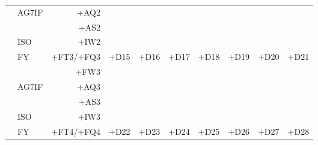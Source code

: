 \begin{center}
{\begin{tabular}{|c|lr|c|c|c|c|c|c|c|}
                        & AG7IF &      +AQ2 &                            &                            &                            &                            &                            &                            &                            \\
                        &       &      +AS2 &                            &                            &                            &                            &                            &                            &                            \\
                        & ISO   &      +IW2 &                            &                            &                            &                            &                            &                            &                            \\
\hline
    \multirow{5}{0.5in}{} & FY    & +FT3/+FQ3 & \multirow[t]{5}{1in}{+D15} & \multirow[t]{5}{1in}{+D16} & \multirow[t]{5}{1in}{+D17} & \multirow[t]{5}{1in}{+D18} & \multirow[t]{5}{1in}{+D19} & \multirow[t]{5}{1in}{+D20} & \multirow[t]{5}{1in}{+D21} \\
                        &       &      +FW3 &                            &                            &                            &                            &                            &                            &                            \\
                        & AG7IF &      +AQ3 &                            &                            &                            &                            &                            &                            &                            \\
                        &       &      +AS3 &                            &                            &                            &                            &                            &                            &                            \\
                        & ISO   &      +IW3 &                            &                            &                            &                            &                            &                            &                            \\
\hline
    \multirow{5}{0.5in}{} & FY    & +FT4/+FQ4 & \multirow[t]{5}{1in}{+D22} & \multirow[t]{5}{1in}{+D23} & \multirow[t]{5}{1in}{+D24} & \multirow[t]{5}{1in}{+D25} & \multirow[t]{5}{1in}{+D26} & \multirow[t]{5}{1in}{+D27} & \multirow[t]{5}{1in}{+D28} \\

\end{tabular}}
\end{center}
